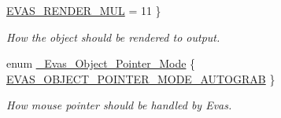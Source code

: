 \begin{DoxyCompactItemize}
\hyperlink{group__Evas__Object__Group__Extras_gga551375283a5e2b0abffd5f40582e9ce2a9da04ad7efd34522071e86a01a57f294}{EVAS\_\-RENDER\_\-MUL} =  11
 \}
\begin{DoxyCompactList}\small\item\em How the object should be rendered to output. \item\end{DoxyCompactList}\item 
enum \hyperlink{group__Evas__Object__Group__Extras_ga822b2a69896ff21279debe2a417e3082}{\_\-Evas\_\-Object\_\-Pointer\_\-Mode} \{ \hyperlink{group__Evas__Object__Group__Extras_gga822b2a69896ff21279debe2a417e3082a088ef2950aeb5a105c53decbbac82a28}{EVAS\_\-OBJECT\_\-POINTER\_\-MODE\_\-AUTOGRAB}
 \}
\begin{DoxyCompactList}\small\item\em How mouse pointer should be handled by Evas. \item\end{DoxyCompactList}\end{DoxyCompactItemize}
